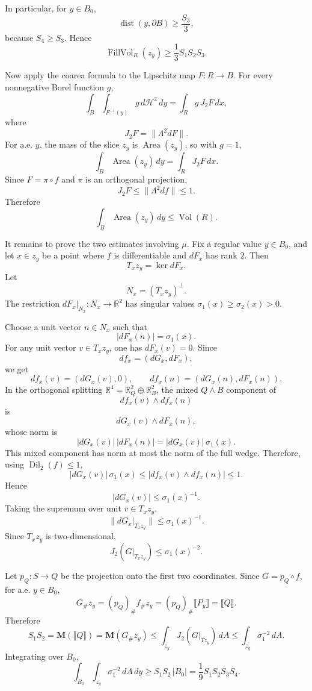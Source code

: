 In particular, for \(y\in B_0\),
\[
\operatorname{dist}(y,\partial B)\ge \frac{S_3}{3},
\]
because \(S_4\ge S_3\). Hence
\[
\operatorname{FillVol}_R(z_y)\ge \frac13 S_1S_2S_3.
\]

Now apply the coarea formula to the Lipschitz map \(F:R\to B\). For every nonnegative Borel function \(g\),
\[
\int_B\int_{F^{-1}(y)} g\,d\mathcal H^2\,dy
=
\int_R g\,J_2F\,dx,
\]
where
\[
J_2F=\|\Lambda^2 dF\|.
\]
For a.e. \(y\), the mass of the slice \(z_y\) is \(\operatorname{Area}(z_y)\), so with \(g=1\),
\[
\int_B \operatorname{Area}(z_y)\,dy
=
\int_R J_2F\,dx.
\]
Since \(F=\pi\circ f\) and \(\pi\) is an orthogonal projection,
\[
J_2F\le \|\Lambda^2df\|\le 1.
\]
Therefore
\[
\int_B \operatorname{Area}(z_y)\,dy
\le
\operatorname{Vol}(R).
\]

It remains to prove the two estimates involving \(\mu\). Fix a regular value \(y\in B_0\), and let \(x\in z_y\) be a point where \(f\) is differentiable and \(dF_x\) has rank \(2\). Then
\[
T_xz_y=\ker dF_x.
\]
Let
\[
N_x=(T_xz_y)^\perp.
\]
The restriction \(dF_x|_{N_x}:N_x\to\mathbb R^2\) has singular values \(\sigma_1(x)\ge \sigma_2(x)>0\).

Choose a unit vector \(n\in N_x\) such that
\[
|dF_x(n)|=\sigma_1(x).
\]
For any unit vector \(v\in T_xz_y\), one has \(dF_x(v)=0\). Since
\[
df_x=(dG_x,dF_x),
\]
we get
\[
df_x(v)=(dG_x(v),0),
\qquad
df_x(n)=(dG_x(n),dF_x(n)).
\]
In the orthogonal splitting \(\mathbb R^4=\mathbb R^2_Q\oplus\mathbb R^2_B\), the mixed \(Q\wedge B\) component of
\[
df_x(v)\wedge df_x(n)
\]
is
\[
dG_x(v)\wedge dF_x(n),
\]
whose norm is
\[
|dG_x(v)|\,|dF_x(n)|
=
|dG_x(v)|\,\sigma_1(x).
\]
This mixed component has norm at most the norm of the full wedge. Therefore, using \(\operatorname{Dil}_2(f)\le 1\),
\[
|dG_x(v)|\,\sigma_1(x)
\le
|df_x(v)\wedge df_x(n)|
\le 1.
\]
Hence
\[
|dG_x(v)|\le \sigma_1(x)^{-1}.
\]
Taking the supremum over unit \(v\in T_xz_y\),
\[
\|dG_x|_{T_xz_y}\|\le \sigma_1(x)^{-1}.
\]
Since \(T_xz_y\) is two-dimensional,
\[
J_2(G|_{T_xz_y})\le \sigma_1(x)^{-2}.
\]

Let \(p_Q:S\to Q\) be the projection onto the first two coordinates. Since \(G=p_Q\circ f\), for a.e. \(y\in B_0\),
\[
G_\#z_y
=
(p_Q)_\# f_\#z_y
=
(p_Q)_\#\llbracket P_y\rrbracket
=
\llbracket Q\rrbracket.
\]
Therefore
\[
S_1S_2
=
\mathbf M(\llbracket Q\rrbracket)
=
\mathbf M(G_\#z_y)
\le
\int_{z_y}J_2(G|_{Tz_y})\,dA
\le
\int_{z_y}\sigma_1^{-2}\,dA.
\]
Integrating over \(B_0\),
\[
\int_{B_0}\int_{z_y}\sigma_1^{-2}\,dA\,dy
\ge
S_1S_2\,|B_0|
=
\frac19 S_1S_2S_3S_4.
\]

